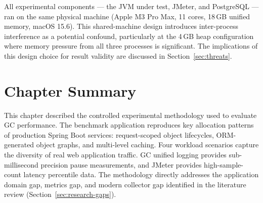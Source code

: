 All experimental components --- the JVM under test, JMeter, and PostgreSQL --- ran on the same physical machine (Apple M3 Pro Max, 11 cores, 18\,GB unified memory, macOS 15.6). This shared-machine design introduces inter-process interference as a potential confound, particularly at the 4\,GB heap configuration where memory pressure from all three processes is significant. The implications of this design choice for result validity are discussed in Section~\ref{sec:threats}.

\section{Chapter Summary}
\label{sec:met-summary}

This chapter described the controlled experimental methodology used to evaluate GC performance. The benchmark application reproduces key allocation patterns of production Spring Boot services: request-scoped object lifecycles, ORM-generated object graphs, and multi-level caching. Four workload scenarios capture the diversity of real web application traffic. GC unified logging provides sub-millisecond precision pause measurements, and JMeter provides high-sample-count latency percentile data. The methodology directly addresses the application domain gap, metrics gap, and modern collector gap identified in the literature review (Section~\ref{sec:research-gaps}).
